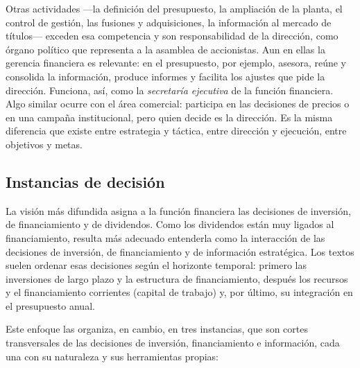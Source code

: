 Otras actividades —la definición del presupuesto, la ampliación de la planta, el control de gestión, las fusiones y adquisiciones, la información al mercado de títulos— exceden esa competencia y son responsabilidad de la dirección, como órgano político que representa a la asamblea de accionistas. Aun en ellas la gerencia financiera es relevante: en el presupuesto, por ejemplo, asesora, reúne y consolida la información, produce informes y facilita los ajustes que pide la dirección. Funciona, así, como la \emph{secretaría ejecutiva} de la función financiera. Algo similar ocurre con el área comercial: participa en las decisiones de precios o en una campaña institucional, pero quien decide es la dirección. Es la misma diferencia que existe entre estrategia y táctica, entre dirección y ejecución, entre objetivos y metas.

\subsection{Instancias de decisión}\label{sec:u1-instancias}

La visión más difundida asigna a la función financiera las decisiones de inversión, de financiamiento y de dividendos. Como los dividendos están muy ligados al financiamiento, resulta más adecuado entenderla como la interacción de las decisiones de inversión, de financiamiento y de información estratégica. Los textos suelen ordenar esas decisiones según el horizonte temporal: primero las inversiones de largo plazo y la estructura de financiamiento, después los recursos y el financiamiento corrientes (capital de trabajo) y, por último, su integración en el presupuesto anual.

Este enfoque las organiza, en cambio, en tres instancias, que son cortes transversales de las decisiones de inversión, financiamiento e información, cada una con su naturaleza y sus herramientas propias:

